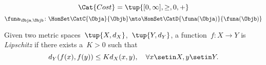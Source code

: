 {\begin{forslides}
\begin{equation}
            \Cat{Cost}=\tup{[0,\infty], \geq, 0, +}
        \end{equation}
        \begin{equation}
            \label{eq:enriched_fun_a}
            \funa_{\Obja, \Objb} \colon \HomSet\CatC{\Obja}{\Objb} \mto \HomSet\CatD{\funa(\Obja)}{\funa(\Objb)}
        \end{equation}
        \begin{definition}
            \label{def:cost_enrich_a}
            Given two metric spaces~$\tup{X,d_X}$,~$\tup{Y,d_Y}$, a function~$f\colon X\to Y$ is \emph{Lipschitz} if there exists a~$K>0$ such that
            \begin{equation}
                d_Y(f(x),f(y))\leq Kd_X(x,y),\quad \forall x\setin X,y\setin Y.
            \end{equation}
        \end{definition}
    \end{forslides}
}

